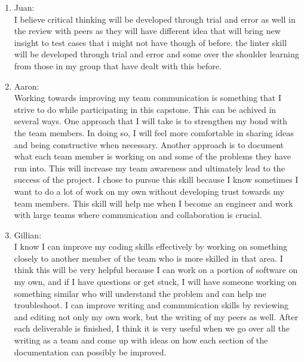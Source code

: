 \documentclass[12pt, titlepage]{article}
\begin{document}
\begin{enumerate}
\begin{enumerate}
    \item{Juan:}\\
    I believe critical thinking will be developed through trial and error as well in the review
    with peers as they will have different idea that will bring new insight to test cases that i might not 
    have though of before. the linter skill will be developed through trial and error and some over the shoulder
     learning from those in my group that have dealt with this before.
 \\
    \item{Aaron:}\\
    Working towards improving my team communication is something that I strive to do while participating
    in this capstone. This can be achived in several ways. One approach that I will take is 
    to strengthen my bond with the team members. In doing so, I will feel more comfortable in sharing ideas and 
    being constructive when necessary. Another approach is to document what each team member is working on and some of the problems they have run into.
    This will increase my team awareness and ultimately lead to the success of the project. I chose to pursue this skill
    because I know sometimes I want to do a lot of work on my own without developing trust towards my team members. This skill
    will help me when I become an engineer and work with large teams where communication and collaboration is crucial.\\
    \item {Gillian:}\\
    I know I can improve my coding skills effectively by working on something closely to another member of the team who is more skilled in that area. I think this will be very helpful because I can work on a portion of software on my own, and if I have questions or get stuck, I will have someone working on something similar who will understand the problem and can help me troubleshoot. 
    \noindent I can improve writing and communication skills by reviewing and editing not only my own work, but the writing of my peers as well. After each deliverable is finished, I think it is very useful when we go over all the writing as a team and come up with ideas on how each section of the documentation can possibly be improved.

  \end{enumerate}

\end{enumerate}
\end{document}
